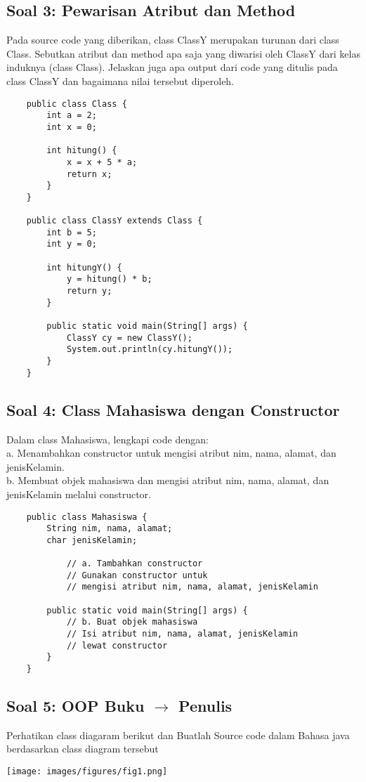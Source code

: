 \documentclass[12pt,titlepage]{article}
\begin{document}
\subsection*{Soal 3: Pewarisan Atribut dan Method}
\noindent
Pada source code yang diberikan, class ClassY merupakan turunan dari class Class. Sebutkan atribut dan method apa saja yang diwarisi oleh ClassY dari kelas induknya (class Class). Jelaskan juga apa output dari code yang ditulis pada class ClassY dan bagaimana nilai tersebut diperoleh.
\begin{verbatim}
    public class Class {
        int a = 2;
        int x = 0;

        int hitung() {
            x = x + 5 * a;
            return x;
        }
    }

    public class ClassY extends Class {
        int b = 5;
        int y = 0;

        int hitungY() {
            y = hitung() * b;
            return y;
        }

        public static void main(String[] args) {
            ClassY cy = new ClassY();
            System.out.println(cy.hitungY());
        }
    }
\end{verbatim}

\subsection*{Soal 4: Class Mahasiswa dengan Constructor}
\noindent
Dalam class Mahasiswa, lengkapi code dengan:\\
a. Menambahkan constructor untuk mengisi atribut nim, nama, alamat, dan jenisKelamin.\\
b. Membuat objek mahasiswa dan mengisi atribut nim, nama, alamat, dan jenisKelamin melalui constructor.
\begin{verbatim}
    public class Mahasiswa {
        String nim, nama, alamat;
        char jenisKelamin;

            // a. Tambahkan constructor
            // Gunakan constructor untuk
            // mengisi atribut nim, nama, alamat, jenisKelamin

        public static void main(String[] args) {
            // b. Buat objek mahasiswa
            // Isi atribut nim, nama, alamat, jenisKelamin
            // lewat constructor
        }
    }
\end{verbatim}

\subsection*{Soal 5: OOP Buku $\rightarrow$ Penulis}
\noindent
Perhatikan class diagaram berikut dan Buatlah Source code dalam Bahasa java berdasarkan class diagram tersebut
\begin{center}
    \texttt{[image: images/figures/fig1.png]}
\end{center}
\end{document}
